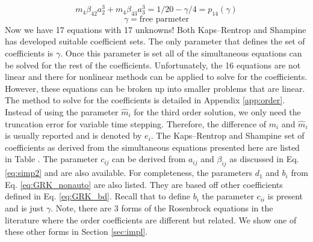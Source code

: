 \documentclass{ansconf}
\numberwithin{equation}{section}
\begin{document}
\begin{equation}
   m_4\beta_{42}a_2^3 + m_4\beta_{43}a_3^3 = 1/20 - \gamma/4 = p_{14}\left(\gamma\right)
\end{equation}
\begin{equation}
   \gamma = \mathrm{free \,\, parmeter}
\end{equation}
Now we have 17 equations with 17 unknowns! Both Kaps--Rentrop and Shampine has developed suitable coefficient sets. The only parameter that defines the set of coefficients is $\gamma$. Once this parameter is set all of the simultaneous equations can be solved for the rest of the coefficients. Unfortunately, the 16 equations are not linear and there for nonlinear methods can be applied to solve for the coefficients. However, these equations can be broken up into smaller problems that are linear. The method to solve for the coefficients is detailed in Appendix \ref{app:order}. Instead of using the parameter $\hat{m}_i$ for the third order solution, we only need the truncation error for variable time stepping. Therefore, the difference of $m_i$ and $\hat{m}_i$ is usually reported and is denoted by $e_i$. The Kaps--Rentrop and Shampine set of coefficients as derived from the simultaneous equations presented here are listed in Table . The parameter $c_{ij}$ can be derived from $a_{ij}$ and $\beta_{ij}$ as discussed in Eq. \eqref{eq:simp2} and are also available. For completeness, the parameters $d_1$ and $b_i$ from Eq. \ref{eq:GRK_nonauto} are also listed. They are based off other coefficients defined in Eq. \ref{eq:GRK_bd}. Recall that to define $b_i$ the parameter $c_{ii}$ is present and is just $\gamma$. Note, there are 3 forms of the Rosenbrock equations in the literature where the order coefficients are different but related. We show one of these other forms in Section \ref{sec:impl}.
\end{document}
